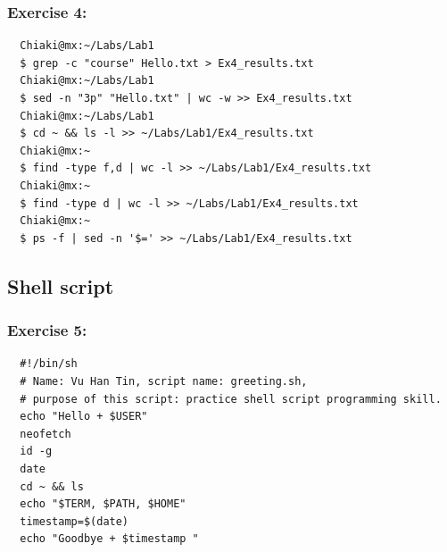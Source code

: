 \documentclass{article}
\begin{document}
\subsubsection{Exercise 4:}
\begin{verbatim}
  Chiaki@mx:~/Labs/Lab1                                                                                                                                                                                          
  $ grep -c "course" Hello.txt > Ex4_results.txt 
  Chiaki@mx:~/Labs/Lab1                                                                                                                                                                                          
  $ sed -n "3p" "Hello.txt" | wc -w >> Ex4_results.txt 
  Chiaki@mx:~/Labs/Lab1                                                                                                                                                                                          
  $ cd ~ && ls -l >> ~/Labs/Lab1/Ex4_results.txt 
  Chiaki@mx:~                                                                                                                                                                                                    
  $ find -type f,d | wc -l >> ~/Labs/Lab1/Ex4_results.txt
  Chiaki@mx:~                                                                                                                                                                                                    
  $ find -type d | wc -l >> ~/Labs/Lab1/Ex4_results.txt 
  Chiaki@mx:~                                                                                                                                                                                                    
  $ ps -f | sed -n '$=' >> ~/Labs/Lab1/Ex4_results.txt                                                                                                                                                                                          
\end{verbatim}
\subsection{Shell script}
\subsubsection{Exercise 5:}
\begin{verbatim}
  #!/bin/sh
  # Name: Vu Han Tin, script name: greeting.sh, 
  # purpose of this script: practice shell script programming skill.
  echo "Hello + $USER" 
  neofetch
  id -g
  date
  cd ~ && ls
  echo "$TERM, $PATH, $HOME"
  timestamp=$(date)
  echo "Goodbye + $timestamp "
\end{verbatim}
\end{document}
